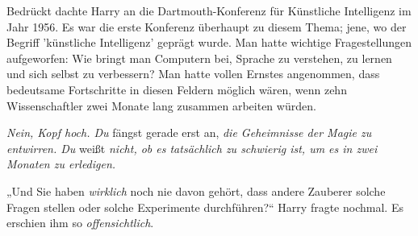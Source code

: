 Bedrückt dachte Harry an die Dartmouth-Konferenz für Künstliche Intelligenz im Jahr 1956. Es war die erste Konferenz überhaupt zu diesem Thema; jene, wo der Begriff 'künstliche Intelligenz' geprägt wurde. Man hatte wichtige Fragestellungen aufgeworfen: Wie bringt man Computern bei, Sprache zu verstehen, zu lernen und sich selbst zu verbessern? Man hatte vollen Ernstes angenommen, dass bedeutsame Fortschritte in diesen Feldern möglich wären, wenn zehn Wissenschaftler zwei Monate lang zusammen arbeiten würden.

\emph{Nein, Kopf hoch. Du} fängst gerade erst an, \emph{die Geheimnisse der Magie zu entwirren. Du} weißt \emph{nicht, ob es tatsächlich zu schwierig ist, um es in zwei Monaten zu erledigen.}

„Und Sie haben \emph{wirklich} noch nie davon gehört, dass andere Zauberer solche Fragen stellen oder solche Experimente durchführen?“ Harry fragte nochmal. Es erschien ihm so \emph{offensichtlich}.

